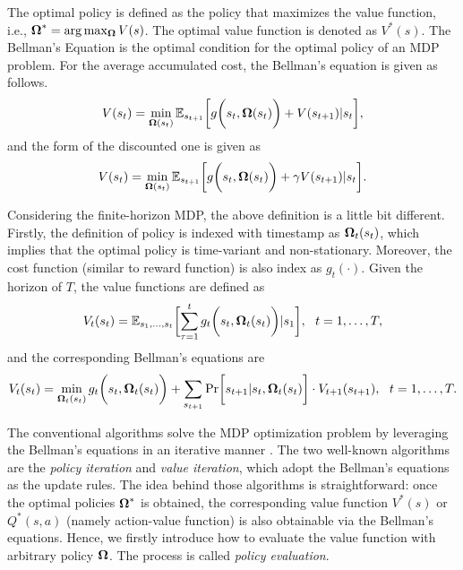 The optimal policy is defined as the policy that maximizes the value function, i.e., $\boldsymbol{\Omega}^* = \arg\max_{\boldsymbol{\Omega}} V(s)$.
The optimal value function is denoted as $V^*(s)$.
The Bellman's Equation is the optimal condition for the optimal policy of an MDP problem.
For the average accumulated cost, the Bellman's equation is given as follows.
\begin{align*}
    V( s_t ) = \min\limits_{ \boldsymbol{\Omega}(s_t) } \mathbb{E}_{s_{t+1}} \bigg[
        g\bigg( s_t, \boldsymbol{\Omega}(s_t) \bigg) + V(s_{t+1}) | s_t
    \bigg],
\end{align*}
and the form of the discounted one is given as
\begin{align*}
    V( s_t ) = \min\limits_{ \boldsymbol{\Omega}(s_t) } \mathbb{E}_{s_{t+1}} \bigg[
        g\bigg( s_t, \boldsymbol{\Omega}(s_t) \bigg) + \gamma V(s_{t+1}) | s_t
    \bigg].
\end{align*}

Considering the finite-horizon MDP, the above definition is a little bit different.
Firstly, the definition of policy is indexed with timestamp as $\boldsymbol{\Omega}_t(s_t)$, which implies that the optimal policy is time-variant and non-stationary.
Moreover, the cost function (similar to reward function) is also index as $g_t(\cdot)$.
Given the horizon of $T$, the value functions are defined as
\begin{align*}
    V_t(s_t) = \mathbb{E}_{s_1,\dots,s_t} \Bracket{
        \sum_{\tau=1}^{t} g_{t}\Paren{ s_t, \Policy_t(s_t) } | s_1
    },~~t=1,\dots,T,
\end{align*}
and the corresponding Bellman's equations are
\begin{align*}
    V_t(s_t) = \min\limits_{ \Policy_{t}(s_t) } g_{t}\Paren{s_t, \Policy_t(s_t)}
                + \sum_{s_{t+1}} \Pr\Bracket{ s_{t+1} | s_t, \Policy_t(s_t) } \cdot V_{t+1}(s_{t+1}),
                ~~t=1,\dots,T.
\end{align*}

The conventional algorithms solve the MDP optimization problem by leveraging the Bellman's equations in an iterative manner \cite{sutton2018reinforcement}.
The two well-known algorithms are the \emph{policy iteration} and \emph{value iteration}, which adopt the Bellman's equations as the update rules.
The idea behind those algorithms is straightforward: once the optimal policies $\boldsymbol{\Omega}^*$ is obtained, the corresponding value function $V^*(s)$ or $Q^*(s, a)$ (namely action-value function) is also obtainable via the Bellman's equations.
Hence, we firstly introduce how to evaluate the value function with arbitrary policy $\boldsymbol{\Omega}$. The process is called \emph{policy evaluation}.

